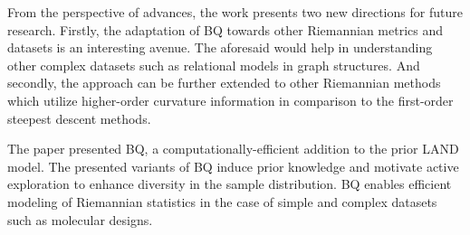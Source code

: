 \documentclass[12pt,letterpaper]{article}
\begin{document}
From the perspective of advances, the work presents two new directions for future research. Firstly, the adaptation of BQ towards other Riemannian metrics and datasets is an interesting avenue. The aforesaid would help in understanding other complex datasets such as relational models in graph structures. And secondly, the approach can be further extended to other Riemannian methods which utilize higher-order curvature information in comparison to the first-order steepest descent methods. 

The paper presented BQ, a computationally-efficient addition to the prior LAND model. The presented variants of BQ induce prior knowledge and motivate active exploration to enhance diversity in the sample distribution. BQ enables efficient modeling of Riemannian statistics in the case of simple and complex datasets such as molecular designs.
\end{document}
